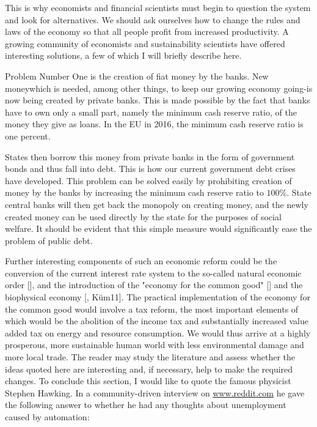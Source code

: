 \documentclass[10pt]{book}
\begin{document}
This is why economists and financial scientists must begin to question the system and look for alternatives. We should ask ourselves how to change the rules and laws of the economy so that all people profit from increased productivity. A growing community of economists and sustainability scientists have offered interesting solutions, a few of which I will briefly describe here.

Problem Number One is the creation of fiat money by the banks. New moneywhich is needed, among other things, to keep our growing economy going-is now being created by private banks. This is made possible by the fact that banks have to own only a small part, namely the minimum cash reserve ratio, of the money they give as loans. In the EU in 2016, the minimum cash reserve ratio is one percent.

States then borrow this money from private banks in the form of government bonds and thus fall into debt. This is how our current government debt crises have developed. This problem can be solved easily by prohibiting creation of money by the banks by increasing the minimum cash reserve ratio to $100 \%$. State central banks will then get back the monopoly on creating money, and the newly created money can be used directly by the state for the purposes of social welfare. It should be evident that this simple measure would significantly ease the problem of public debt.

Further interesting components of such an economic reform could be the conversion of the current interest rate system to the so-called natural economic order [\cite{gp58}], and the introduction of the "economy for the common good" [\cite{fel14}] and the biophysical economy [\cite{gk09}, Küm11]. The practical implementation of the economy for the common good would involve a tax reform, the most important elements of which would be the abolition of the income tax and substantially increased value\\
added tax on energy and resource consumption. We would thus arrive at a highly prosperous, more sustainable human world with less environmental damage and more local trade. The reader may study the literature and assess whether the ideas quoted here are interesting and, if necessary, help to make the required changes.
To conclude this section, I would like to quote the famous physicist Stephen Hawking. In a community-driven interview on \href{http://www.reddit.com}{www.reddit.com} he gave the following answer to whether he had any thoughts about unemployment caused by automation:
\end{document}
